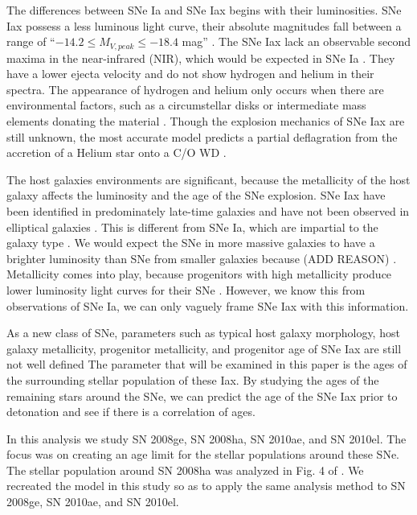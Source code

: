 \documentclass[preprint]{aastex}
\begin{document}
The differences between SNe Ia and SNe Iax begins with their luminosities.
SNe Iax possess a less luminous light curve, 
their absolute magnitudes fall between a range of 
``$-14.2 \leq M_{V,peak} \leq -18.4$ mag''
 \citep{fol1304}.
The SNe Iax lack an observable second maxima in the near-infrared (NIR),
which would be expected in SNe Ia \citep{li03}. 
They have a lower ejecta velocity and do not show hydrogen and helium in their
 spectra.
The appearance of hydrogen and helium only occurs when there are environmental factors, such as  
a circumstellar disks or intermediate mass elements donating the material \citep{fol09}. 
Though the explosion mechanics of SNe Iax are still unknown, the most accurate model
predicts a partial deflagration from the accretion of a Helium star 
onto a C/O WD \citep{krom13, fol1304}.

The host galaxies environments are significant, because
the metallicity of the host galaxy affects the luminosity and the age of the
SNe explosion.
SNe Iax have been identified in predominately late-time galaxies
and have not been observed in elliptical galaxies \citep{fol1304}. 
This is different from SNe Ia, which are impartial to the galaxy type \citep{van92}. 
We would expect the SNe in more massive galaxies to have a brighter 
luminosity than SNe from smaller galaxies because (ADD REASON)  \citep{fol1305}. 
Metallicity comes into play, because progenitors with high 
metallicity produce lower luminosity light curves for their SNe \citep{tim03}. 
However, we know this from observations of SNe Ia, we can only vaguely frame SNe Iax with this information. 

As a new class of SNe, parameters such as typical host galaxy morphology,
 host galaxy metallicity, progenitor metallicity, and progenitor age of SNe Iax are still not well defined 
The parameter that will be examined in this paper is the ages 
of the surrounding stellar population of these Iax.
By studying the ages of the remaining stars around the SNe,
we can predict the age of the SNe Iax prior to detonation and 
see if there is a correlation of ages.  

In this analysis we study SN 2008ge, SN 2008ha, 
SN 2010ae, and SN 2010el. %
The focus was on creating an age limit for the stellar populations around these SNe.
The stellar population around SN 2008ha was analyzed in Fig. 4 of \citet{fol1409}.
We recreated the model in this study so as to apply the same analysis method to
SN 2008ge, SN 2010ae, and SN 2010el. %
\end{document}
